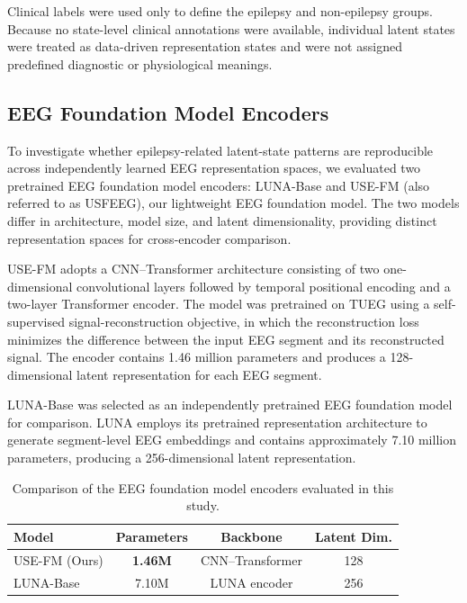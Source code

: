 Clinical labels were used only to define the epilepsy and non-epilepsy groups.
Because no state-level clinical annotations were available, individual latent
states were treated as data-driven representation states and were not assigned
predefined diagnostic or physiological meanings.


\subsection{EEG Foundation Model Encoders}

To investigate whether epilepsy-related latent-state patterns are reproducible
across independently learned EEG representation spaces, we evaluated two
pretrained EEG foundation model encoders: LUNA-Base and USE-FM (also referred
to as USFEEG), our lightweight EEG foundation model. The two models differ in
architecture, model size, and latent dimensionality, providing distinct
representation spaces for cross-encoder comparison.

USE-FM adopts a CNN--Transformer architecture consisting of two one-dimensional
convolutional layers followed by temporal positional encoding and a two-layer
Transformer encoder. The model was pretrained on TUEG using a self-supervised
signal-reconstruction objective, in which the reconstruction loss minimizes
the difference between the input EEG segment and its reconstructed signal. The
encoder contains 1.46 million parameters and produces a 128-dimensional latent
representation for each EEG segment.

LUNA-Base was selected as an independently pretrained EEG foundation model for
comparison. LUNA employs its pretrained representation architecture to generate
segment-level EEG embeddings and contains approximately 7.10 million
parameters, producing a 256-dimensional latent representation.

\begin{table}[t]
\centering
\caption{Comparison of the EEG foundation model encoders evaluated in this study.}
\label{tab:model_compare}
\setlength{\tabcolsep}{6pt}
\renewcommand{\arraystretch}{1.10}
\begin{tabular}{lccc}
\toprule
Model & Parameters & Backbone & Latent Dim. \\
\midrule
USE-FM (Ours) & \textbf{1.46M} & CNN--Transformer & 128 \\
LUNA-Base & 7.10M & LUNA encoder & 256 \\
\bottomrule
\end{tabular}
\end{table}

